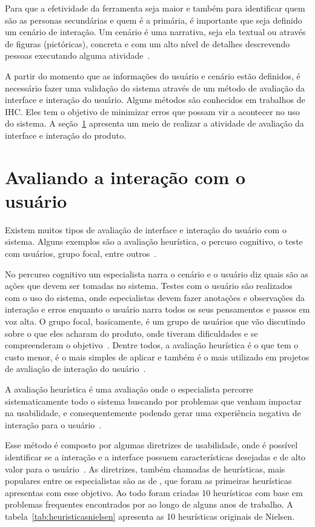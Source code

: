 Para que a efetividade da ferramenta seja maior e também para identificar quem são as personas secundárias e quem é a primária, é importante que seja definido um cenário de interação. Um cenário é uma narrativa, seja ela textual ou através de figuras (pictóricas), concreta e com um alto nível de detalhes descrevendo pessoas executando alguma atividade~\cite{barbosa:2010}.

A partir do momento que as informações do usuário e cenário estão definidos, é necessário fazer uma validação do sistema através de um método de avaliação da interface e interação do usuário. Alguns métodos são conhecidos em trabalhos de IHC. Eles tem o objetivo de minimizar erros que possam vir a acontecer no uso do sistema. A seção~\ref{sec:avaliacao} apresenta um meio de realizar a atividade de avaliação da interface e interação do produto.

\section{Avaliando a interação com o usuário}
\label{sec:avaliacao}
Existem muitos tipos de avaliação de interface e interação do usuário com o sistema. Alguns exemplos são a avaliação heurística, o percuso cognitivo, o teste com usuários, grupo focal, entre outros~\cite{barbosa:2010}.

No percurso cognitivo um especialista narra o cenário e o usuário diz quais são as ações que devem ser tomadas no sistema. Testes com o usuário são realizados com o uso do sistema, onde especialistas devem fazer anotações e observações da interação e erros enquanto o usuário narra todos os seus pensamentos e passos em voz alta. O grupo focal, basicamente, é um grupo de usuários que vão discutindo sobre o que eles acharam do produto, onde tiveram dificuldades e se compreenderam o objetivo~\cite{barbosa:2010}. Dentre todos, a avaliação heurística é o que tem o custo menor, é o mais simples de aplicar e também é o mais utilizado em projetos de avaliação de interação do usuário~\cite{tsui:2010}.

A avaliação heurística é uma avaliação onde o especialista percorre sistematicamente todo o sistema buscando por problemas que venham impactar na usabilidade, e consequentemente podendo gerar uma experiência negativa de interação para o usuário~\cite{barbosa:2010, benyon:2011}.

Esse método é composto por algumas diretrizes de usabilidade, onde é possível identificar se a interação e a interface possuem características desejadas e de alto valor para o usuário~\cite{barbosa:2010, benyon:2011}. As diretrizes, também chamadas de heurísticas, mais populares entre os especialistas são as de \textcite{nielsen:1994}, que foram as primeiras heurísticas apresentas com esse objetivo. Ao todo foram criadas 10 heurísticas com base em problemas frequentes encontrados por \textcite{nielsen:1994} ao longo de alguns anos de trabalho. A tabela~\ref{tab:heuristicasnielsen} apresenta as 10 heurísticas originais de Nielsen.

